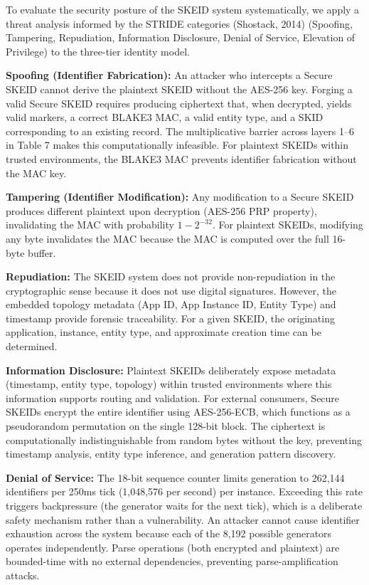 \documentclass[fleqn,10pt,lineno]{wlpeerj}
\begin{document}
To evaluate the security posture of the SKEID system systematically, we
apply a threat analysis informed by the STRIDE categories (Shostack,
2014) (Spoofing, Tampering, Repudiation, Information Disclosure, Denial
of Service, Elevation of Privilege) to the three-tier identity model.

\textbf{Spoofing (Identifier Fabrication):} An attacker who intercepts a
Secure SKEID cannot derive the plaintext SKEID without the AES-256 key.
Forging a valid Secure SKEID requires producing ciphertext that, when
decrypted, yields valid markers, a correct BLAKE3 MAC, a valid entity
type, and a SKID corresponding to an existing record. The multiplicative
barrier across layers 1--6 in Table 7 makes this computationally
infeasible. For plaintext SKEIDs within trusted environments, the BLAKE3
MAC prevents identifier fabrication without the MAC key.

\textbf{Tampering (Identifier Modification):} Any modification to a
Secure SKEID produces different plaintext upon decryption (AES-256 PRP
property), invalidating the MAC with probability \(1 - 2^{-32}\). For
plaintext SKEIDs, modifying any byte invalidates the MAC because the MAC
is computed over the full 16-byte buffer.

\textbf{Repudiation:} The SKEID system does not provide non-repudiation
in the cryptographic sense because it does not use digital signatures.
However, the embedded topology metadata (App ID, App Instance ID, Entity
Type) and timestamp provide forensic traceability. For a given SKEID,
the originating application, instance, entity type, and approximate
creation time can be determined.

\textbf{Information Disclosure:} Plaintext SKEIDs deliberately expose
metadata (timestamp, entity type, topology) within trusted environments
where this information supports routing and validation. For external
consumers, Secure SKEIDs encrypt the entire identifier using
AES-256-ECB, which functions as a pseudorandom permutation on the single
128-bit block. The ciphertext is computationally indistinguishable from
random bytes without the key, preventing timestamp analysis, entity type
inference, and generation pattern discovery.

\textbf{Denial of Service:} The 18-bit sequence counter limits
generation to 262,144 identifiers per 250ms tick (1,048,576 per second)
per instance. Exceeding this rate triggers backpressure (the generator
waits for the next tick), which is a deliberate safety mechanism rather
than a vulnerability. An attacker cannot cause identifier exhaustion
across the system because each of the 8,192 possible generators operates
independently. Parse operations (both encrypted and plaintext) are
bounded-time with no external dependencies, preventing
parse-amplification attacks.
\end{document}
